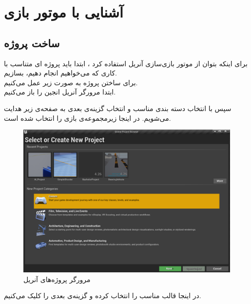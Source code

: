 \chapter {آشنایی با موتور بازی}

\section{ساخت پروژه}

برای اینکه بتوان از موتور بازی‌سازی آنریل استفاده کرد ، ابتدا باید پروژه ای متناسب با کاری که می‌خواهیم انجام دهیم، بسازیم.
\\
برای ساختن پروژه به صورت زیر عمل می‌کنیم.
\\
ابتدا مرورگر آنریل انجین را باز می‌کنیم.


سپس با انتخاب دسته بندی مناسب و انتخاب گزینه‌ی بعدی به صفحه‌ی زیر هدایت می‌شویم. در اینجا  زیرمجموعه‌ی بازی را انتخاب شده است.

\begin{figure}[H]
	\centerline{\includegraphics[width=\textwidth,height=\textheight,keepaspectratio]{Figures/Ch2/UnrealEngineBrowser.png}}
	\caption{مرورگر پروژه‌های آنریل}
	\label{fig:Unreal engine Browser}
\end{figure}

\par\bigskip 
\noindent


در اینجا قالب مناسب را انتخاب کرده و گزینه‌ی بعدی را کلیک می‌کنیم.

